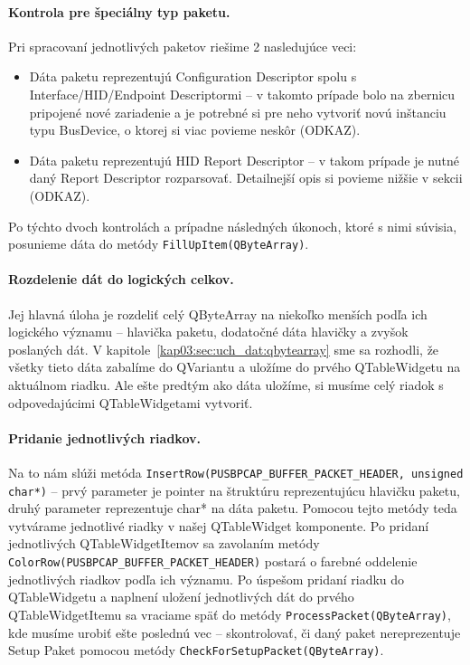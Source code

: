 \paragraph{Kontrola pre špeciálny typ paketu.}
\hfill \break
Pri spracovaní jednotlivých paketov riešime 2 nasledujúce veci:
\begin{itemize}
\item Dáta paketu reprezentujú Configuration Descriptor spolu s Interface/HID/Endpoint Descriptormi -- v takomto prípade bolo na zbernicu pripojené nové zariadenie a je potrebné si pre neho vytvoriť novú inštanciu typu BusDevice, o ktorej si viac povieme neskôr (ODKAZ).
\item Dáta paketu reprezentujú HID Report Descriptor -- v takom prípade je nutné daný Report Descriptor rozparsovať. Detailnejší opis si povieme nižšie v sekcii (ODKAZ).
\end{itemize}
Po týchto dvoch kontrolách a prípadne následných úkonoch, ktoré s nimi súvisia, posunieme dáta do metódy \texttt{FillUpItem(QByteArray)}.  

\paragraph{Rozdelenie dát do logických celkov.}
\hfill \break
Jej hlavná úloha je rozdeliť celý QByteArray na niekoľko menších podľa ich logického významu -- hlavička paketu, dodatočné dáta hlavičky a zvyšok poslaných dát. V kapitole~\ref{kap03:sec:uch_dat:qbytearray} sme sa rozhodli, že všetky tieto dáta zabalíme do QVariantu a uložíme do prvého QTableWidgetu na aktuálnom riadku. Ale ešte predtým ako dáta uložíme, si musíme celý riadok s odpovedajúcimi QTableWidgetami vytvoriť.

\paragraph{Pridanie jednotlivých riadkov.}
\hfill \break
Na to nám slúži metóda \texttt{InsertRow(PUSBPCAP\_BUFFER\_PACKET\_HEADER, unsigned char*)} -- prvý parameter je pointer na štruktúru reprezentujúcu hlavičku paketu, druhý parameter reprezentuje char* na dáta paketu. Pomocou tejto metódy teda vytvárame jednotlivé riadky v našej QTableWidget komponente. Po pridaní jednotlivých QTableWidgetItemov sa zavolaním metódy \texttt{ColorRow(PUSBPCAP\_BUFFER\_PACKET\_HEADER)} postará o farebné oddelenie jednotlivých riadkov podľa ich významu. Po úspešom pridaní riadku do QTableWidgetu a naplnení uložení jednotlivých dát do prvého QTableWidgetItemu sa vraciame späť do metódy \texttt{ProcessPacket(QByteArray)}, kde musíme urobiť ešte poslednú vec -- skontrolovať, či daný paket nereprezentuje Setup Paket pomocou metódy \texttt{CheckForSetupPacket(QByteArray)}. 

